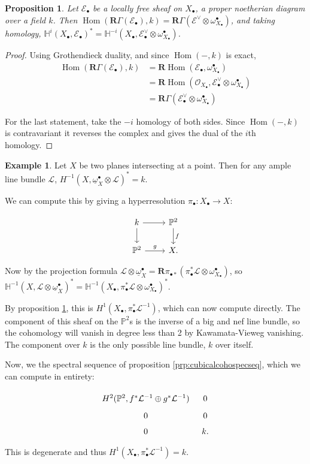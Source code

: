 \documentclass{report}
\newtheorem{prop}[theorem]{Proposition}
\theoremstyle{definition}
\newtheorem{example}[theorem]{Example}
\DeclareMathOperator{\Hom}{Hom}
\newcommand{\EE}{\mathscr{E}}
\newcommand{\HH}{\mathbb{H}}
\newcommand{\LL}{\mathcal{L}}
\newcommand{\OO}{\mathcal{O}}
\newcommand{\PP}{\mathbb{P}}
\newcommand{\bR}{\textbf{R}}
\newcommand{\db}{\underline{\omega}^\bullet}
\begin{document}
\begin{prop}
	\label{prp:cohofdual}
	Let $\EE_\bullet$ be a locally free sheaf on $X_\bullet$, a proper noetherian diagram over a field $k$.
	Then $\Hom(\bR \Gamma(\EE_\bullet),k) = \bR \Gamma(\EE^\vee \otimes \omega_{X_\bullet}^\bullet)$, and taking homology,
	$\HH^i (X_\bullet, \EE_\bullet)^* = \HH^{-i}(X_\bullet, \EE_\bullet^\vee \otimes \omega_{X_\bullet}^\bullet)$.
\end{prop}
\begin{proof}
	Using Grothendieck duality, and since $\Hom(-,k)$ is exact,
	\begin{align*}
		\Hom(\bR \Gamma(\EE_\bullet),k) &= \bR \Hom(\EE_\bullet, \omega_{X_\bullet}^\bullet) \\
		&= \bR \Hom(\OO_{X_\bullet}, \EE_\bullet^\vee \otimes \omega_{X_\bullet}^\bullet) \\
		&= \bR \Gamma(\EE_\bullet^\vee \otimes \omega_{X_\bullet}^\bullet)
	\end{align*}
	
	For the last statement, take the $-i$ homology of both sides.
	Since $\Hom(-,k)$ is contravariant it reverses the complex and gives the dual of the $i$th homology.
\end{proof}

\begin{example}
	Let $X$ be two planes intersecting at a point.
	Then for any ample line bundle $\LL$, $H^{-1}(X,\db_X \otimes \LL)^* = k$.
	
	We can compute this by giving a hyperresolution $\pi_\bullet : X_\bullet \rightarrow X$:
	
	\[\begin{tikzcd}
		k \arrow{r} \arrow{d} & \PP^2 \arrow{d}{f} \\
		\PP^2 \arrow{r}{g} & X.
	\end{tikzcd}\]
	
	Now by the projection formula $\LL \otimes \db_X = \bR \pi_{\bullet *} (\pi_\bullet^* \LL \otimes \omega_{X_\bullet}^\bullet)$, so $\HH^{-1}(X, \LL \otimes \db_X)^* = \HH^{-1}(X_\bullet, \pi_\bullet^* \LL \otimes \omega_{X_\bullet}^\bullet)^*$.
	
	By proposition \ref{prp:cohofdual}, this is $H^1(X_\bullet, \pi_\bullet^* \LL^{-1})$, which can now compute directly.
	The component of this sheaf on the $\PP^2$s is the inverse of a big and nef line bundle, so the cohomology will vanish in degree less than 2 by Kawamata-Vieweg vanishing.
	The component over $k$ is the only possible line bundle, $k$ over itself.
	
	Now, we the spectral sequence of proposition \ref{prp:cubicalcohospecseq}, which we can compute in entirety:
	
	\[\begin{tikzcd}[row sep = tiny, column sep = tiny]
	H^2(\PP^2, f^* \LL^{-1} \oplus g^* \LL^{-1}) & 0 \\
	0 & 0 \\
	0 & k.
	\end{tikzcd}\]
	
	This is degenerate and thus $H^1(X_\bullet, \pi_\bullet^* \LL^{-1}) = k$.
\end{example}
\end{document}
